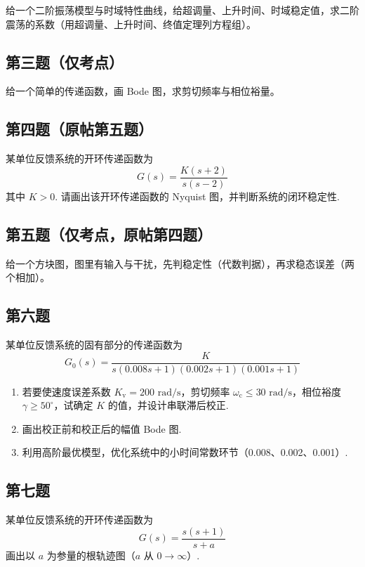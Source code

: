 \documentclass[UTF8]{ctexart}
\newcommand{\rs}{\text{ rad/s}}
\newcommand{\wc}{\omega_\text{c}}
\begin{document}
给一个二阶振荡模型与时域特性曲线，给超调量、上升时间、时域稳定值，求二阶震荡的系数（用超调量、上升时间、终值定理列方程组）。

\subsection*{第三题（仅考点）}

给一个简单的传递函数，画 Bode 图，求剪切频率与相位裕量。

\subsection*{第四题（原帖第五题）}

某单位反馈系统的开环传递函数为
\[
G(s)=\frac{K(s+2)}{s(s-2)}
\]
其中 $K>0$. 请画出该开环传递函数的 Nyquist 图，并判断系统的闭环稳定性.

\subsection*{第五题（仅考点，原帖第四题）}

给一个方块图，图里有输入与干扰，先判稳定性（代数判据），再求稳态误差（两个相加）。

\subsection*{第六题}

某单位反馈系统的固有部分的传递函数为
\[
G_0(s)=\frac{K}{s(0.008s+1)(0.002s+1)(0.001s+1)}
\]

\begin{enumerate}
    \item[(1)] 若要使速度误差系数 $K_\text{v}=200\rs$，剪切频率 $\wc\le 30 \rs$，相位裕度 $\gamma\ge50^\circ$，试确定 $K$ 的值，并设计串联滞后校正.
    \item[(2)] 画出校正前和校正后的幅值 Bode 图.
    \item[(3)] 利用高阶最优模型，优化系统中的小时间常数环节（0.008、0.002、0.001）.
\end{enumerate}

\subsection*{第七题}

某单位反馈系统的开环传递函数为
\[
G(s)=\frac{s(s+1)}{s+a}
\]
画出以 $a$ 为参量的根轨迹图（$a$ 从 $0\rightarrow\infty$）.
\end{document}
